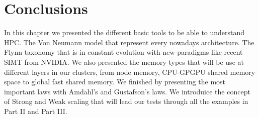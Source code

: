 	\section{Conclusions}

	In this chapter we presented the different basic tools to be able to understand HPC. 
	The Von Neumann model that represent every nowadays architecture. 
	The Flynn taxonomy that is in constant evolution with new paradigms like recent SIMT from NVIDIA. 
	We also presented the memory types that will be use at different layers in our clusters, from node memory, CPU-GPGPU shared memory space to global fast shared memory. 
	We finished by presenting the most important laws with Amdahl's and Gustafson's laws.
	We introduice the concept of Strong and Weak scaling that will lead our tests through all the examples in Part II and Part III. 
